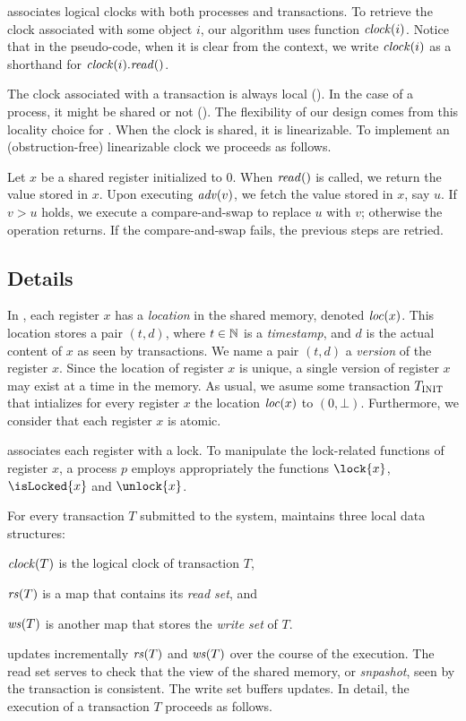  associates logical clocks with both processes and transactions.
To retrieve the clock associated with some object $i$, our algorithm uses function $\clockOf{i}$.
Notice that in the pseudo-code, when it is clear from the context, 
we write $\clockOf{i}$ as a shorthand for $\clockOf{i}.\mathit{read}()$.

The clock associated with a transaction is always local ().
In the case of a process, it might be shared or not ().
The flexibility of our design comes from this locality choice for .
When the clock is shared, it is linearizable.
To implement an (obstruction-free) linearizable clock we proceeds as follows.
\begin{construction}
  Let $x$ be a shared register initialized to $0$.
  When $\cread$ is called, we return the value stored in $x$.
  Upon executing $\cadv(v)$, we fetch the value stored in $x$, say $u$.
  If $v > u$ holds, we execute a compare-and-swap to replace $u$ with $v$; 
  otherwise the operation returns.
  If the compare-and-swap fails, the previous steps are retried.
\end{construction}



\subsection{Details}

In , each register $x$ has a \emph{location} in the shared memory, denoted $\locationOf{x}$.
This location stores a pair $(t,d)$, where $t \in \naturalSet$ is a \emph{timestamp}, and $d$ is the actual content of $x$ as seen by transactions.
We name a pair $(t,d)$ a \emph{version} of the register $x$.
Since the location of register $x$ is unique, a single version of register $x$ may exist at a time in the memory.
As usual, we asume some transaction $\transInit$ that intializes for every register $x$ the location $\locationOf{x}$ to $(0,\bot)$.
Furthermore, we consider that each register $x$ is atomic.

 associates each register with a lock.
To manipulate the lock-related functions of register $x$, 
a process $p$ employs appropriately the functions $\lock{x}$, $\isLocked{x}$ and $\unlock{x}$.

For every transaction $T$ submitted to the system,  maintains three local data structures:
\begin{inparaenum}[]
\item $\clockOf{T}$ is the logical clock of transaction $T$,
\item $\readSetOf{T}$ is a map that contains its \emph{read set}, and 
\item $\writeSetOf{T}$ is another map that stores the \emph{write set} of $T$.
\end{inparaenum}
 updates incrementally $\readSetOf{T}$ and $\writeSetOf{T}$ over the course of the execution.
The read set serves to check that the view of the shared memory, or \emph{snpashot}, seen by the transaction is consistent.
The write set buffers updates.
In detail, the execution of a transaction $T$ proceeds as follows.

